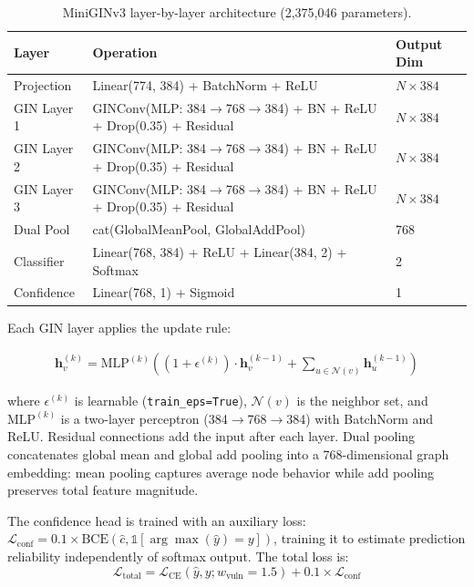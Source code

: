 \begin{table}[H]
\centering
\small
\caption{MiniGINv3 layer-by-layer architecture (2,375,046 parameters).}
\label{tab:miniginv3-layers}
\begin{tabular}{lll}
\toprule
\textbf{Layer} & \textbf{Operation} & \textbf{Output Dim} \\
\midrule
Projection  & Linear(774, 384) + BatchNorm + ReLU & $N \times 384$ \\
GIN Layer 1 & GINConv(MLP: 384$\to$768$\to$384) + BN + ReLU + Drop(0.35) + Residual & $N \times 384$ \\
GIN Layer 2 & GINConv(MLP: 384$\to$768$\to$384) + BN + ReLU + Drop(0.35) + Residual & $N \times 384$ \\
GIN Layer 3 & GINConv(MLP: 384$\to$768$\to$384) + BN + ReLU + Drop(0.35) + Residual & $N \times 384$ \\
Dual Pool   & cat(GlobalMeanPool, GlobalAddPool) & 768 \\
Classifier  & Linear(768, 384) + ReLU + Linear(384, 2) + Softmax & 2 \\
Confidence  & Linear(768, 1) + Sigmoid & 1 \\
\bottomrule
\end{tabular}
\end{table}

Each GIN layer applies the update rule:

\begin{align}
\mathbf{h}_v^{(k)} = \text{MLP}^{(k)}\!\left((1 + \epsilon^{(k)}) \cdot \mathbf{h}_v^{(k-1)} + \sum_{u \in \mathcal{N}(v)} \mathbf{h}_u^{(k-1)}\right)
\label{eq:gin-update}
\end{align}

\noindent where $\epsilon^{(k)}$ is learnable (\texttt{train\_eps=True}), $\mathcal{N}(v)$ is the neighbor set, and $\text{MLP}^{(k)}$ is a two-layer perceptron (384$\to$768$\to$384) with BatchNorm and ReLU. Residual connections add the input after each layer. Dual pooling concatenates global mean and global add pooling into a 768-dimensional graph embedding: mean pooling captures average node behavior while add pooling preserves total feature magnitude.

The confidence head is trained with an auxiliary loss: $\mathcal{L}_{\text{conf}} = 0.1 \times \text{BCE}(\hat{c}, \mathbb{1}[\arg\max(\hat{y}) = y])$, training it to estimate prediction reliability independently of softmax output. The total loss is:
\[
\mathcal{L}_{\text{total}} = \mathcal{L}_{\text{CE}}(\hat{y}, y; w_{\text{vuln}}=1.5) + 0.1 \times \mathcal{L}_{\text{conf}}
\]

